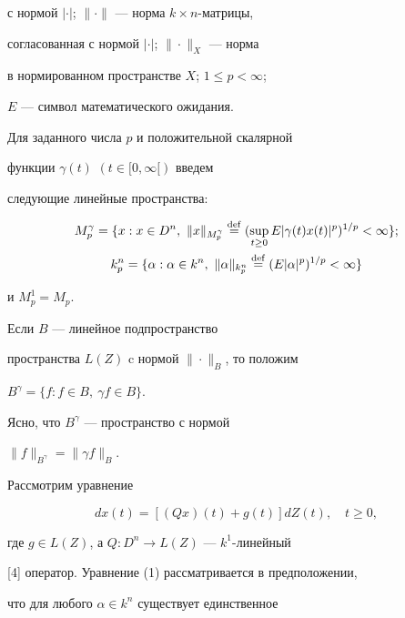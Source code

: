 с нормой $|\cdot|$; $\|\cdot\|$ --- норма $k\times n$-матрицы,


согласованная с нормой $|\cdot|$; $\|\cdot\|_X$ --- норма


в нормированном пространстве $X$; $1 \le p < \infty$;


$E$ --- символ математического ожидания.





Для заданного числа $p$ и положительной скалярной


функции $\gamma (t)$ $(t \in [0, \infty [)$ введем


следующие линейные пространства:


\begin{gather*}


M^\gamma _p = \{x: x \in D^n,\ \|x\|_{M^\gamma _p}\Def


(\sup_{t\ge0}E|\gamma (t)x(t)|^p)^{1/p} < \infty \};\\


%


k^n _p = \{\alpha : \alpha \in k^n,\ \|\alpha \|_{k^n _p}\Def


(E|\alpha |^p)^{1/p} < \infty \}


\end{gather*}


и $M^1_p = M_p$.





Если $B$ --- линейное подпространство


пространства $L(Z)$ c нормой $\|\cdot\|_B$, то положим


$B^\gamma = \{f: f \in B,\ \gamma f \in B\}$.


Ясно, что $B^\gamma $ --- пространство с нормой


$\|f\|_{B^\gamma } = \|\gamma f\|_B$.





Рассмотрим уравнение


\begin{equation}


dx(t) = [(Qx)(t) + g(t)]dZ(t),\quad t \ge 0,


\end{equation}


где $g \in L(Z)$, а $Q:D^n \to L(Z )$ --- $k^1$-линейный


[4] оператор. Уравнение (1) рассматривается в предположении,


что для любого $\alpha \in k^n$ существует единственное


